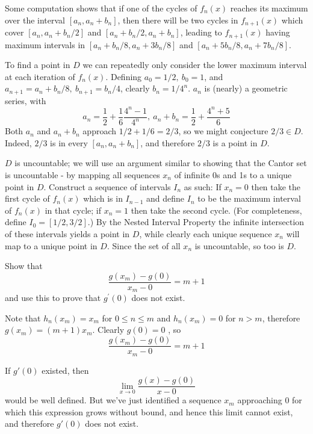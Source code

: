 \begin{solution}
{Some computation shows that if one of the cycles of \(f_n(x)\) reaches its maximum over the interval \([a_n, a_n + b_n]\), then there will be two cycles in \(f_{n+1}(x)\) which cover \([a_n, a_n + b_n / 2]\) and \([a_n + b_n/2, a_n + b_n]\), leading to \(f_{n+1}(x)\) having maximum intervals in \([a_n + b_n/8, a_n + 3b_n/8]\) and \([a_n + 5b_n/8, a_n + 7b_n/8]\).

To find a point in \(D\) we can repeatedly only consider the lower maximum interval at each iteration of \(f_n(x)\). Defining \(a_0 = 1/2,\ b_0 = 1\), and \(a_{n+1} =a_n + b_n/8,\ b_{n+1} = b_n/4\), clearly \(b_n = 1/4^n\). \(a_n\) is (nearly) a geometric series, with
\[a_n = \frac{1}{2} + \frac{1}{6} \frac{4^n-1}{4^n},\ a_n + b_n = \frac{1}{2} + \frac{4^n + 5}{6}\]
Both \(a_n\) and \(a_n + b_n\) approach \(1/2 + 1/6 = 2/3\), so we might conjecture \(2/3 \in D\). Indeed, \(2/3\) is in every \([a_n, a_n + b_n]\), and therefore \(2/3\) is a point in \(D\).

\item \(D\) is uncountable; we will use an argument similar to showing that the Cantor set is uncountable - by mapping all sequences \(x_n\) of infinite 0s and 1s to a unique point in \(D\). Construct a sequence of intervals \(I_n\) as such: If \(x_n = 0\) then take the first cycle of \(f_n(x)\) which is in \(I_{n-1}\) and define \(I_n\) to be the maximum interval of \(f_n(x)\) in that cycle; if \(x_n = 1\) then take the second cycle. (For completeness, define \(I_0 = [1/2, 3/2]\).) By the Nested Interval Property the infinite intersection of these intervals yields a point in \(D\), while clearly each unique sequence \(x_n\) will map to a unique point in \(D\). Since the set of all \(x_n\) is uncountable, so too is \(D\).

}
\end{solution}

\begin{exercise}
Show that
$$
\frac{g\left(x_{m}\right)-g(0)}{x_{m}-0}=m+1
$$
and use this to prove that $g^{\prime}(0)$ does not exist.
\end{exercise}

\begin{solution}
Note that \(h_n(x_m) = x_m\) for \(0 \leq n \leq m\) and \(h_n(x_m) = 0\) for \(n > m\), therefore \(g(x_m) = (m + 1) x_m\). Clearly \(g(0) = 0\) , so
\[\frac{g\left(x_{m}\right)-g(0)}{x_{m}-0}=m+1\]

If \(g'(0)\) existed, then
\[\lim_{x \to 0} \frac{g(x)-g(0)}{x-0}\]
would be well defined. But we've just identified a sequence \(x_m\) approaching 0 for which this expression grows without bound, and hence this limit cannot exist, and therefore \(g'(0)\) does not exist.
\end{solution}

